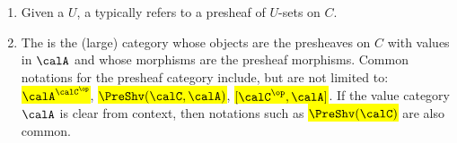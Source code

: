 \begin{definition}
\begin{enumerate}
        \item Given a  $U$, a  typically refers to a presheaf of $U$-sets on $C$.

        \item The  is the (large) category whose objects are the presheaves on $C$ with values in $\calA$ and whose morphisms are the presheaf morphisms. Common notations for the presheaf category include, but are not limited to: \hl{$\calA^{\calC^{\op}}$}, \hl{$\PreShv(\calC, \calA)$}, \hl{$[\calC^{\op}, \calA]$}. If the value category $\calA$ is clear from context, then notations such as \hl{$\PreShv(\calC)$} are also common. 

    \end{enumerate}
\end{definition}
